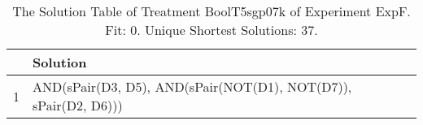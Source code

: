 \begin{table}[ht]
\centering
\begin{tabular}{rp{9cm}}
  \hline
 & Solution \\ 
  \hline
1 & AND(sPair(D3, D5), AND(sPair(NOT(D1), NOT(D7)), sPair(D2, D6))) \\ 
   \hline
\end{tabular}
\caption{The Solution Table of Treatment BoolT5sgp07k of Experiment ExpF. Fit: 0. Unique Shortest Solutions: 37.} 
\end{table}

